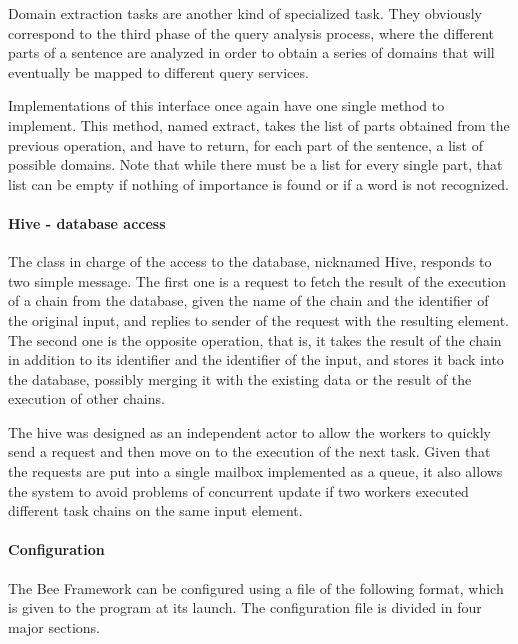Domain extraction tasks are another kind of specialized task. They obviously correspond to the third phase of the query analysis process, where the different parts of a sentence are analyzed in order to obtain a series of domains that will eventually be mapped to different query services.

Implementations of this interface once again have one single method to implement. This method, named extract, takes the list of parts obtained from the previous operation, and have to return, for each part of the sentence, a list of possible domains. Note that while there must be a list for every single part, that list can be empty if nothing of importance is found or if a word is not recognized.



\paragraph{Hive - database access} %
\label{par:hive_database_access}

The class in charge of the access to the database, nicknamed Hive, responds to two simple message. The first one is a request to fetch the result of the execution of a chain from the database, given the name of the chain and the identifier of the original input, and replies to sender of the request with the resulting element. The second one is the opposite operation, that is, it takes the result of the chain in addition to its identifier and the identifier of the input, and stores it back into the database, possibly merging it with the existing data or the result of the execution of other chains.

The hive was designed as an independent actor to allow the workers to quickly send a request and then move on to the execution of the next task. Given that the requests are put into a single mailbox implemented as a queue, it also allows the system to avoid problems of concurrent update if two workers executed different task chains on the same input element.


\paragraph{Configuration} %
\label{par:configuration}

The Bee Framework can be configured using a file of the following format, which is given to the program at its launch. The configuration file is divided in four major sections.

